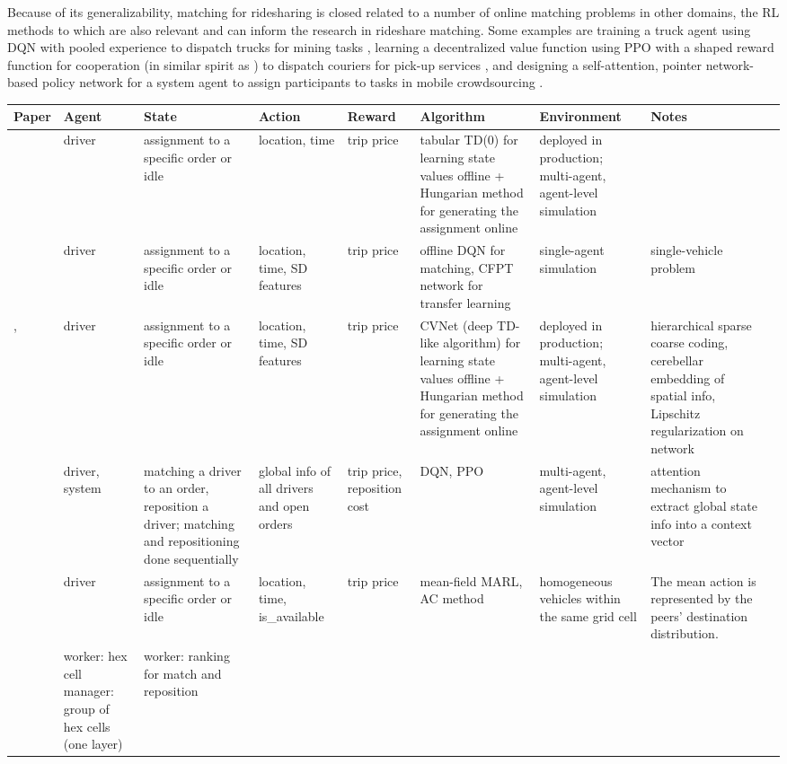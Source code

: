 \documentclass{article}
\begin{document}
Because of its generalizability, matching for ridesharing is closed related to a number of online matching problems in other domains, the RL methods to which are also relevant and can inform the research in rideshare matching. Some examples are training a truck agent using DQN with pooled experience to dispatch trucks for mining tasks \citep{zhang2020dynamic}, learning a decentralized value function using PPO with a shaped reward function for cooperation (in similar spirit as \citep{ke2020learning}) to dispatch couriers for pick-up services \citep{chen2019can}, and designing a self-attention, pointer network-based policy network for a system agent to assign participants to tasks in mobile crowdsourcing \citep{shen2020auxiliary}. 


\begin{table}
\scriptsize
\begin{tabular}{||p{}|p{}|p{}|p{}|p{}|p{}|p{}|p{}|p{}||} 
\hline
Paper & Agent & State & Action & Reward & Algorithm & Environment & Notes \\
\hline\hline
\cite{xu2018large} & driver & assignment to a specific order or idle & location, time & trip price & tabular TD(0) for learning state values offline + Hungarian method for generating the assignment online & deployed in production;
multi-agent, agent-level simulation & \\
\hline
\cite{qin2018dispatching} & driver & assignment to a specific order or idle & location, time, SD features & trip price & offline DQN for matching,
CFPT network for transfer learning & single-agent simulation & single-vehicle problem \\
\hline
\cite{tang2019deep}, \cite{qin2020ride} & driver & assignment to a specific order or idle & location, time, SD features & trip price & CVNet (deep TD-like algorithm) for learning state values offline + Hungarian method for generating the assignment online & deployed in production;
multi-agent, agent-level simulation & hierarchical sparse coarse coding, cerebellar embedding of spatial info, Lipschitz regularization on network \\
\hline
\cite{holler2019deep} & driver, system & matching a driver to an order, reposition a driver;
matching and repositioning done sequentially & global info of all drivers and open orders & trip price, reposition cost & DQN, PPO & multi-agent, agent-level simulation & attention mechanism to extract global state info into a context vector \\
\hline
\cite{li2019efficient} & driver & assignment to a specific order or idle & location, time, is\_available & trip price & mean-field MARL, AC method & homogeneous vehicles within the same grid cell & The mean action is represented by the peers' destination distribution. \\
\hline
\cite{jin2019coride} & worker: hex cell
manager: group of hex cells (one layer) & worker: ranking for match and reposition


\end{tabular}
\end{table}
\end{document}
